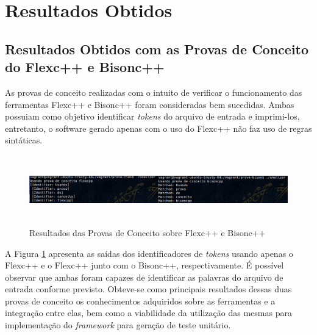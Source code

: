 \section{Resultados Obtidos}
\subsection{Resultados Obtidos com as Provas de Conceito do Flexc++ e Bisonc++}
As provas de conceito realizadas com o intuito de verificar o funcionamento das ferramentas Flexc++ e Bisonc++ foram consideradas bem sucedidas. Ambas possuiam como objetivo identificar \textit{tokens} do arquivo de entrada e imprimi-los, entretanto, o software gerado apenas com o uso do Flexc++ não faz uso de regras sintáticas. 

 \begin{figure}[h]
    \centering
    \includegraphics[width=\textwidth,height=3cm]{figuras/resultadosPCBF.png}
    \caption{Resultados das Provas de Conceito sobre Flexc++ e Bisonc++}
    \label{fig:resultadosPCBF}
 \end{figure}

\par
\indent A Figura \ref{fig:resultadosPCBF} apresenta as saídas dos identificadores de \textit{tokens} usando apenas o Flexc++ e o Flexc++ junto com o Bisonc++, respectivamente. É possível observar que ambas foram capazes de identificar as palavras do arquivo de entrada conforme previsto. Obteve-se como principais resultados dessas duas provas de conceito os conhecimentos adquiridos sobre as ferramentas e a integração entre elas, bem como a viabilidade da utilização das mesmas para implementação do \textit{framework} para geração de teste unitário.

